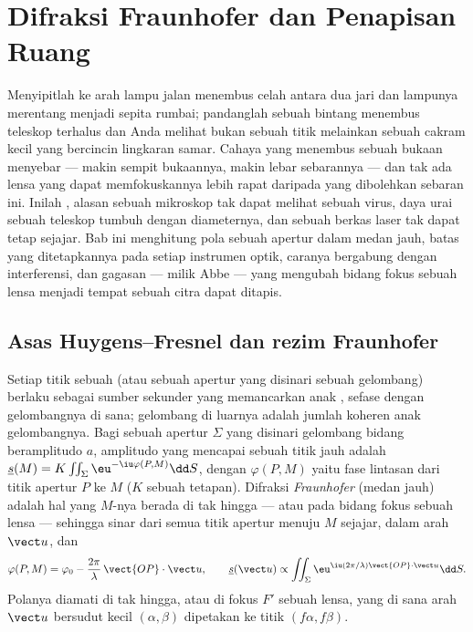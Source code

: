 \chapter{Difraksi Fraunhofer dan Penapisan Ruang}\label{ch:b2:diffraction}

Menyipitlah ke arah lampu jalan menembus celah antara dua jari dan
lampunya merentang menjadi sepita rumbai; pandanglah sebuah bintang menembus
teleskop terhalus dan Anda melihat bukan sebuah titik melainkan sebuah cakram kecil yang bercincin
lingkaran samar. Cahaya yang menembus sebuah bukaan menyebar --- makin
sempit bukaannya, makin lebar sebarannya --- dan tak ada lensa yang dapat memfokuskannya
lebih rapat daripada yang dibolehkan sebaran ini. Inilah \emph{}, alasan
sebuah mikroskop tak dapat melihat sebuah virus, daya urai sebuah teleskop tumbuh
dengan diameternya, dan sebuah berkas laser tak dapat tetap sejajar. Bab ini
menghitung pola  sebuah apertur dalam medan jauh,
batas yang ditetapkannya pada setiap instrumen optik, caranya bergabung dengan
interferensi, dan gagasan --- milik Abbe --- yang mengubah bidang fokus sebuah
lensa menjadi tempat sebuah citra dapat ditapis.

\section{Asas Huygens--Fresnel dan rezim Fraunhofer}

\begin{definition}\label{def:b2:diffraction:huygens}
Setiap titik sebuah  (atau sebuah apertur yang disinari sebuah gelombang) berlaku sebagai
sumber sekunder yang memancarkan anak , sefase dengan gelombangnya
di sana; gelombang di luarnya adalah jumlah koheren anak gelombangnya. Bagi sebuah
apertur $\Sigma$ yang disinari gelombang bidang beramplitudo $a$, amplitudo
yang mencapai sebuah titik jauh adalah $\underline s(M) = K\iint_\Sigma\eu^{-\iu\varphi(P, M)}\dd S$, dengan
$\varphi(P, M)$ yaitu fase lintasan dari titik apertur $P$ ke $M$
($K$ sebuah tetapan). Difraksi \emph{Fraunhofer} (medan jauh) adalah hal
yang $M$-nya berada di tak hingga --- atau pada bidang fokus sebuah lensa --- sehingga
sinar dari semua titik apertur menuju $M$ sejajar, dalam
arah $\vect u$, dan
\[
\varphi(P, M) = \varphi_0 - \frac{2\pi}\lambda\,\vect{OP}\cdot\vect u , \qquad
\underline s(\vect u) \propto \iint_\Sigma\eu^{\iu(2\pi/\lambda)\vect{OP}\cdot\vect u}\dd S .
\]
Polanya diamati di tak hingga, atau di fokus $F'$ sebuah lensa,
yang di sana arah $\vect u$ bersudut kecil $(\alpha, \beta)$ dipetakan ke
titik $(f\alpha, f\beta)$.
\end{definition}
\admitted

